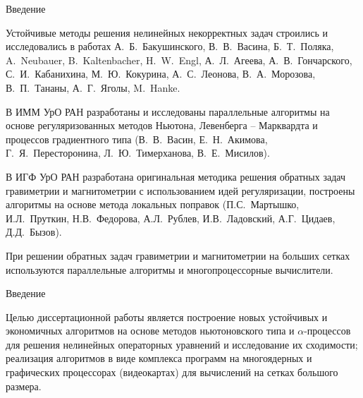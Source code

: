 \documentclass[10pt,pdf, mathserif, hyperref={unicode}]{beamer}
\begin{document}
\begin{frame}{Введение}
	
Устойчивые методы решения нелинейных некорректных задач 
строились и исследовались в работах А.~Б.~Бакушинского, В.~В.~Васина,  Б.~Т.~Поляка, A.~Neubauer, B.~Kaltenbacher, H.~W.~Engl, А.~Л.~Агеева, А.~В.~Гончарского, С.~И.~Кабанихина, М.~Ю.~Кокурина, А.~С.~Леонова, В.~А.~Морозова, В.~П.~Тананы, А.~Г.~Яголы, M.~Hanke.
%

В ИММ УрО РАН разработаны и исследованы параллельные алгоритмы на основе регуляризованных методов Ньютона, Левенберга -- Марквардта и процессов градиентного типа (В.~В.~Васин, Е.~Н.~Акимова, Г.~Я.~Пересторонина, Л.~Ю.~Тимерханова, В.~Е.~Мисилов).

В ИГФ УрО РАН разработана оригинальная методика решения обратных задач гравиметрии и магнитометрии с использованием идей регуляризации, построены алгоритмы на основе метода локальных поправок (П.С.~Мартышко,  И.Л.~Пруткин, Н.В.~Федорова, А.Л.~Рублев, И.В.~Ладовский, А.Г.~Цидаев, Д.Д.~Бызов).  

При решении обратных задач гравиметрии и магнитометрии на больших сетках используются параллельные алгоритмы и многопроцессорные вычислители.
\end{frame}

\begin{frame}{Введение}
	
	\begin{block}{}
		{\color{blue}Целью} диссертационной работы является построение новых устойчивых и экономичных алгоритмов на основе методов ньютоновского типа и $\alpha$-процессов для решения нелинейных операторных уравнений и исследование их сходимости; реализация алгоритмов в виде комплекса программ на многоядерных и графических процессорах (видеокартах) для вычислений на сетках большого размера.
	\end{block}
\end{frame}
\end{document}
